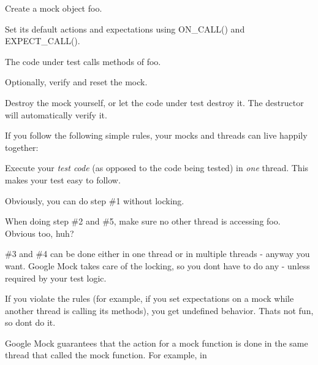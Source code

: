 \begin{DoxyEnumerate}
\item Create a mock object {\ttfamily foo}.
\end{DoxyEnumerate}
\begin{DoxyEnumerate}
\item Set its default actions and expectations using {\ttfamily O\+N\+\_\+\+C\+A\+L\+L()} and {\ttfamily E\+X\+P\+E\+C\+T\+\_\+\+C\+A\+L\+L()}.
\end{DoxyEnumerate}
\begin{DoxyEnumerate}
\item The code under test calls methods of {\ttfamily foo}.
\end{DoxyEnumerate}
\begin{DoxyEnumerate}
\item Optionally, verify and reset the mock.
\end{DoxyEnumerate}
\begin{DoxyEnumerate}
\item Destroy the mock yourself, or let the code under test destroy it. The destructor will automatically verify it.
\end{DoxyEnumerate}

If you follow the following simple rules, your mocks and threads can live happily together\+:


\begin{DoxyItemize}
\item Execute your {\itshape test code} (as opposed to the code being tested) in {\itshape one} thread. This makes your test easy to follow.
\item Obviously, you can do step \#1 without locking.
\item When doing step \#2 and \#5, make sure no other thread is accessing {\ttfamily foo}. Obvious too, huh?
\item \#3 and \#4 can be done either in one thread or in multiple threads -\/ anyway you want. Google Mock takes care of the locking, so you don\textquotesingle{}t have to do any -\/ unless required by your test logic.
\end{DoxyItemize}

If you violate the rules (for example, if you set expectations on a mock while another thread is calling its methods), you get undefined behavior. That\textquotesingle{}s not fun, so don\textquotesingle{}t do it.

Google Mock guarantees that the action for a mock function is done in the same thread that called the mock function. For example, in


